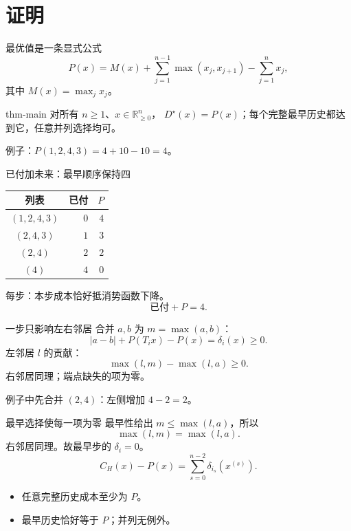 \documentclass{beamer}
\begin{document}
\section{证明}
\begin{frame}{最优值是一条显式公式}
\[
P(x)=M(x)+\sum_{j=1}^{n-1}\max(x_j,x_{j+1})-\sum_{j=1}^n x_j,
\]
其中 $M(x)=\max_jx_j$。
\begin{bookresult}{thm-main}
对所有 $n\geq1$、$x\in\mathbb R_{\geq0}^n$，
$D^{\star}(x)=P(x)$；每个完整最早历史都达到它，任意并列选择均可。
\end{bookresult}
例子：$P(1,2,4,3)=4+10-10=4$。
\end{frame}
\begin{frame}{已付加未来：最早顺序保持四}
\centering
\begin{tabular}{c|r|r}
列表 & 已付 & $P$\\\hline
$(1,2,4,3)$ & $0$ & $4$\\
$(2,4,3)$ & $1$ & $3$\\
$(2,4)$ & $2$ & $2$\\
$(4)$ & $4$ & $0$
\end{tabular}
\bigskip

每步：本步成本恰好抵消势函数下降。
\[
\text{已付}+P=4.
\]
\end{frame}
\begin{frame}{一步只影响左右邻居}
合并 $a,b$ 为 $m=\max(a,b)$：
\[
|a-b|+P(T_i x)-P(x)=\delta_i(x)\geq0.
\]
左邻居 $l$ 的贡献：
\[
\max(l,m)-\max(l,a)\geq0.
\]
右邻居同理；端点缺失的项为零。

例子中先合并 $(2,4)$：左侧增加 $4-2=2$。
\end{frame}
\begin{frame}{最早选择使每一项为零}
最早性给出 $m\leq\max(l,a)$，所以
\[
\max(l,m)=\max(l,a).
\]
右邻居同理。故最早步的 $\delta_i=0$。
\[
C_H(x)-P(x)=\sum_{s=0}^{n-2}\delta_{i_s}(x^{(s)}).
\]
\begin{itemize}
\item 任意完整历史成本至少为 $P$。
\item 最早历史恰好等于 $P$；并列无例外。
\end{itemize}
\end{frame}
\end{document}
